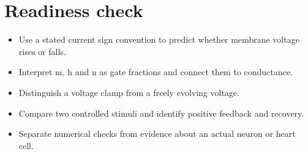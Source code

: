 \documentclass[11pt,letterpaper]{article}
\theoremstyle{definition}\newtheorem{definition}{Definition}\newtheorem{example}{Example}
\numberwithin{equation}{section}
\begin{document}
\section*{Readiness check}
\begin{itemize}
\item Use a stated current sign convention to predict whether membrane voltage rises or falls.
\item Interpret m, h and n as gate fractions and connect them to conductance.
\item Distinguish a voltage clamp from a freely evolving voltage.
\item Compare two controlled stimuli and identify positive feedback and recovery.
\item Separate numerical checks from evidence about an actual neuron or heart cell.
\end{itemize}
\end{document}
